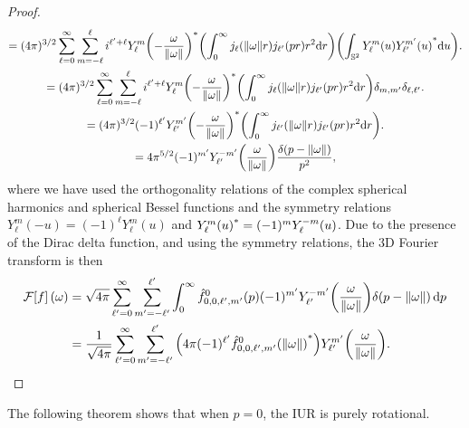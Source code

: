 \documentclass[../../main.tex]{subfiles}
\begin{document}
\begin{refsection}
\begin{proof}
\begin{multline*}
			= (4\pi)^{3/2} \sum_{\ell=0}^\infty \sum_{m=-\ell}^\ell i^{\ell' + \ell} {Y^{m}_\ell\qty(-\frac{\omega}{\norm{\omega}} )}^*
			\qty(\int_0^\infty j_\ell(\norm{\omega} r) j_{\ell'} (p r) r^2 \dd r)
			\qty(\int_{\mathbb{S}^2} Y^{m}_\ell(u) {Y^{m'}_{\ell'}(u)}^* \dd u).\\
			= (4\pi)^{3/2} \sum_{\ell=0}^\infty \sum_{m=-\ell}^\ell i^{\ell' + \ell} {Y^{m}_\ell\qty(-\frac{\omega}{\norm{\omega}} )}^*
			\qty(\int_0^\infty j_\ell(\norm{\omega} r) j_{\ell'} (p r) r^2 \dd r)
			\delta_{m,m'} \delta_{\ell,\ell'}.\\
			= (4\pi)^{3/2} (-1)^{\ell'} {Y^{m'}_{\ell'}\qty(-\frac{\omega}{\norm{\omega}} )}^*
			\qty(\int_0^\infty j_{\ell'}(\norm{\omega} r) j_{\ell'} (p r) r^2 \dd r).\\
			= 4 \pi^{5/2} (-1)^{m'} Y^{-m'}_{\ell'}\qty(\frac{\omega}{\norm{\omega}} ) \frac{\delta(p - \norm{\omega})}{p^2},
		\end{multline*}
		where we have used the orthogonality relations of the complex spherical harmonics and spherical Bessel functions and the symmetry relations $Y_{\ell}^m(-u) = (-1)^\ell Y_{\ell}^m(u)$ and ${Y_{\ell}^m(u)}^* = (-1)^m Y_{\ell}^{-m}(u)$.
		Due to the presence of the Dirac delta function, and using the symmetry relations, the 3D Fourier transform is then
		\begin{align*}
			\mathcal{F}\qty[f](\omega)
			 & = \sqrt{4 \pi} \sum_{\ell'=0}^\infty \sum_{m'=-\ell'}^{\ell'} \int_{0}^\infty \hat{f}^0_{0,0,\ell',m'}(p) (-1)^{m'} Y^{-m'}_{\ell'}\qty(\frac{\omega}{\norm{\omega}} ) \delta(p - \norm{\omega}) \dd{p} \\
			 & = \frac{1}{\sqrt{4 \pi}} \sum_{\ell'=0}^\infty \sum_{m'=-\ell'}^{\ell'} \qty(4\pi (-1)^{\ell'} {\hat{f}^0_{0,0,\ell',m'}(\norm{\omega})}^*) Y^{m'}_{\ell'}\qty(\frac{\omega}{\norm{\omega}}).
		\end{align*}
	\end{proof}

	The following theorem shows that when $p=0$, the IUR is purely rotational.


\end{refsection}
\end{document}
